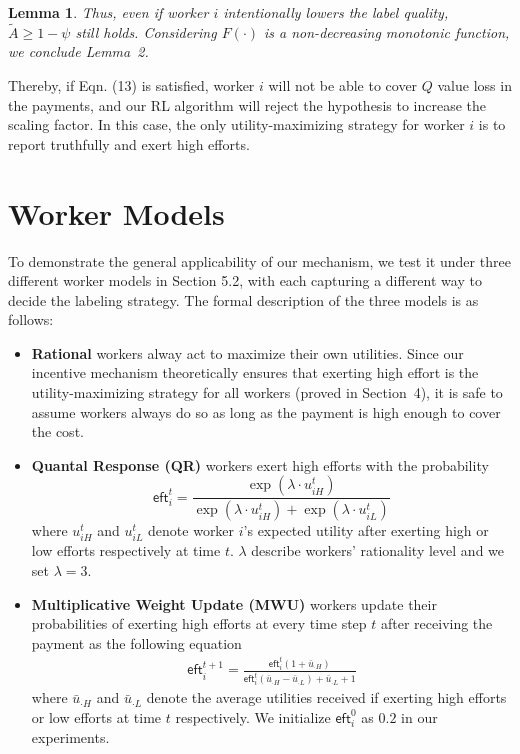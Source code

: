 \documentclass{article}
\makeatletter
\newcounter{lemmas}
\newtheorem{lemma}[lemmas]{Lemma}
\renewenvironment{proof}[1][\proofname]{\par
  \vspace{-\topsep}%
  \pushQED{\qed}%
  \normalfont
  \topsep0pt \partopsep0pt %
  \trivlist
  \item[\hskip\labelsep
        \itshape
    #1\@addpunct{.}]\ignorespaces
}{%
  \popQED\endtrivlist\@endpefalse
  \addvspace{0pt plus 0pt} %
}
\makeatother
\begin{document}
\begin{lemma}
\begin{proof}
Thus, even if worker $i$ intentionally lowers the label quality, $\tilde{A}\geq 1-\psi$ still holds.
Considering $F(\cdot)$ is a non-decreasing monotonic function, we conclude Lemma~2.
\end{proof}
\end{lemma}
Thereby, if Eqn. (13) is satisfied, worker $i$ will not be able to cover $Q$ value loss in the payments, and our RL algorithm will reject the hypothesis to increase the scaling factor.
In this case, the only utility-maximizing strategy for worker $i$ is to report truthfully and exert high efforts.


\section{Worker Models}
To demonstrate the general applicability of our mechanism, we test it under three different worker models in Section 5.2, with each capturing a different way to decide the labeling strategy.
The formal description of the three models is as follows:
\begin{itemize}[topsep=0pt, partopsep=0pt]
\item {\bf Rational} workers alway act to maximize their own utilities. Since our incentive mechanism theoretically ensures that exerting high effort %
is the utility-maximizing strategy for all workers (proved in Section~4), it is safe to assume workers always do so as long as the payment is high enough to cover the cost.
\item {\bf Quantal Response (QR)} workers \cite{mckelvey1995quantal} exert high efforts with the probability 
$$
\textsf{eft}_i^t= \frac{\exp(\lambda\cdot  u_{iH}^t)}{\exp(\lambda \cdot u_{iH}^t) + \exp (\lambda \cdot u_{iL}^t)}
$$
where $u_{iH}^t$ and $u_{iL}^t$ denote worker $i$'s expected utility after exerting high or low efforts respectively at time $t$. $\lambda$ describe workers' rationality level and we set $\lambda =3$.

\item {\bf Multiplicative Weight Update (MWU)} workers \cite{chastain2014algorithms} update their probabilities of exerting high efforts at every time step $t$ after receiving the payment as the following equation
\begin{align*}
\textsf{eft}_i^{t+1} = \frac{\textsf{eft}_i^t(1+\bar{u}_{\cdot H})}{\textsf{eft}_i^t(\bar{u}_{\cdot H} - \bar{u}_{\cdot L}) + \bar{u}_{\cdot L} + 1}
\end{align*}
where $\bar{u}_{\cdot H}$ and $\bar{u}_{\cdot L}$ denote the average utilities received if exerting high efforts or low efforts at time $t$ respectively. We initialize $\textsf{eft}_i^0$ as $0.2$ in our experiments.
\end{itemize}
\end{document}
